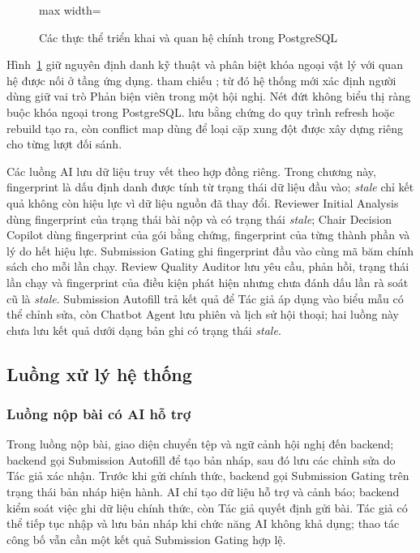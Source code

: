 \begin{figure}[H]
\begin{adjustbox}{max width=\textwidth}
  \end{adjustbox}
  \caption{Các thực thể triển khai và quan hệ chính trong PostgreSQL}
  \label{fig:ch3-data-cut}
\end{figure}

Hình~\ref{fig:ch3-data-cut} giữ nguyên định danh kỹ thuật và phân biệt khóa ngoại vật lý với quan hệ được nối ở tầng ứng dụng.  tham chiếu ; từ đó hệ thống mới xác định người dùng giữ vai trò Phản biện viên trong một hội nghị. Nét đứt không biểu thị ràng buộc khóa ngoại trong PostgreSQL.  lưu bằng chứng do quy trình refresh hoặc rebuild tạo ra, còn conflict map dùng để loại cặp xung đột được xây dựng riêng cho từng lượt đối sánh.

Các luồng AI lưu dữ liệu truy vết theo hợp đồng riêng. Trong chương này, fingerprint là dấu định danh được tính từ trạng thái dữ liệu đầu vào; \textit{stale} chỉ kết quả không còn hiệu lực vì dữ liệu nguồn đã thay đổi. Reviewer Initial Analysis dùng fingerprint của trạng thái bài nộp và có trạng thái \textit{stale}; Chair Decision Copilot dùng fingerprint của gói bằng chứng, fingerprint của từng thành phần và lý do hết hiệu lực. Submission Gating ghi fingerprint đầu vào cùng mã băm chính sách cho mỗi lần chạy. Review Quality Auditor lưu yêu cầu, phản hồi, trạng thái lần chạy và fingerprint của điều kiện phát hiện nhưng chưa đánh dấu lần rà soát cũ là \textit{stale}. Submission Autofill trả kết quả để Tác giả áp dụng vào biểu mẫu có thể chỉnh sửa, còn Chatbot Agent lưu phiên và lịch sử hội thoại; hai luồng này chưa lưu kết quả dưới dạng bản ghi có trạng thái \textit{stale}.

\subsection{Luồng xử lý hệ thống}

\subsubsection{Luồng nộp bài có AI hỗ trợ}

Trong luồng nộp bài, giao diện chuyển tệp và ngữ cảnh hội nghị đến backend; backend gọi Submission Autofill để tạo bản nháp, sau đó lưu các chỉnh sửa do Tác giả xác nhận. Trước khi gửi chính thức, backend gọi Submission Gating trên trạng thái bản nháp hiện hành. AI chỉ tạo dữ liệu hỗ trợ và cảnh báo; backend kiểm soát việc ghi dữ liệu chính thức, còn Tác giả quyết định gửi bài. Tác giả có thể tiếp tục nhập và lưu bản nháp khi chức năng AI không khả dụng; thao tác công bố vẫn cần một kết quả Submission Gating hợp lệ.

